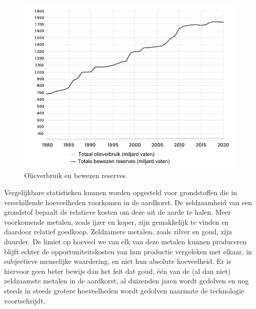 \begin{figure}[!htb]
\centering
    \includegraphics[width=\textwidth]{figures/fig5.pdf}
\caption[Olieverbruik en bewezen reserves]{Olieverbruik en bewezen reserves\footnotemark}
\label{fig5}
\end{figure}
\autocite{34}

Vergelijkbare statistieken kunnen worden opgesteld voor grondstoffen die
in verschillende hoeveelheden voorkomen in de aardkorst. De zeldzaamheid
van een grondstof bepaalt de relatieve kosten om deze uit de aarde te
halen. Meer voorkomende metalen, zoals ijzer en koper, zijn gemakkelijk
te vinden en daardoor relatief goedkoop. Zeldzamere metalen, zoals
zilver en goud, zijn duurder. De limiet op hoeveel we van elk van deze
metalen kunnen produceren blijft echter de opportuniteitskosten van hun
productie vergeleken met elkaar, in subjectieve menselijke waardering,
en niet hun absolute hoeveelheid. Er is hiervoor geen beter bewijs dan
het feit dat goud, één van de (al dan niet) zeldzaamste metalen in de
aardkorst, al duizenden jaren wordt gedolven en nog steeds in steeds
grotere hoeveelheden wordt gedolven naarmate de technologie
voortschrijdt.


